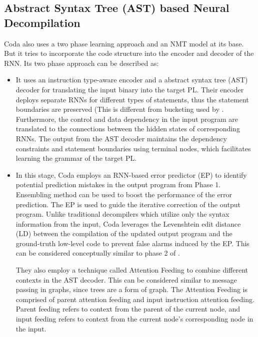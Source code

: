 \documentclass{article}
\begin{document}
\subsection{Abstract Syntax Tree (AST) based Neural Decompilation}
Coda \cite{coda} also uses a two phase learning approach and an NMT model at its base. But it tries to incorporate the code structure into the encoder and decoder of the RNN. Its two phase approach can be described as:
\begin{itemize}
    \item It uses an instruction type-aware encoder and a abstract syntax tree (AST) decoder
for translating the input binary into the target PL. Their encoder deploys separate RNNs for different
types of statements, thus the statement boundaries are preserved (This is different from bucketing used by \citet{katz2019towards}. Furthermore, the control and data dependency in the input program are translated to the connections between the hidden states of corresponding RNNs. The output from the AST decoder maintains the dependency constraints and statement boundaries using terminal nodes, which facilitates learning the grammar of the target PL.
    
    \item In this stage, Coda employs an RNN-based error predictor (EP) to identify potential
prediction mistakes in the output program from Phase 1. Ensembling method can be used to boost
the performance of the error prediction. The EP is used to guide the iterative correction of the output
program. Unlike traditional decompilers which utilize only the syntax information from the input,
Coda leverages the Levenshtein edit distance (LD) between the compilation of the updated output
program and the ground-truth low-level code to prevent false alarms induced by the EP. This can be considered conceptually similar to phase 2 of \citet{katz2019towards}.

They also employ a technique called Attention Feeding to combine different contexts in the AST decoder. This can be considered similar to message passing in graphs, since trees are a form of graph. The Attention Feeding is comprised of parent attention feeding and input instruction attention feeding. Parent feeding refers to context from the parent of the current node, and input feeding refers to context from the current node's corresponding node in the input.
\end{itemize}
\end{document}
